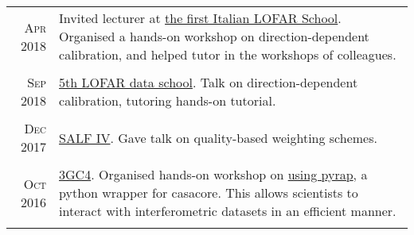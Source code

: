 \begin{tabular}{r|p{16.5cm}}
\textsc{Apr 2018} & Invited lecturer at \href{https://indico.ced.inaf.it/event/9/}{the first Italian LOFAR School}. Organised a hands-on workshop on direction-dependent calibration, and helped tutor in the workshops of colleagues.\\
\multicolumn{2}{c}{} \\

\textsc{Sep 2018} & \href{https://www.astron.nl/lofarschool2018/}{5th LOFAR data school}. Talk on direction-dependent calibration, tutoring hands-on tutorial.\\
\multicolumn{2}{c}{} \\

\textsc{Dec 2017} & \href{http://www.physics.usyd.edu.au/salf_iv/}{SALF IV}. Gave talk on quality-based weighting schemes.\\
\multicolumn{2}{c}{} \\

\textsc{Oct 2016} & \href{http://www.ast.uct.ac.za/ast/meetings-workshops/3gc4}{3GC4}. Organised hands-on workshop on \href{https://github.com/ebonnassieux/Teaching/blob/master/PyrapTutorial.ipynb}{using pyrap}, a python wrapper for casacore. This allows scientists to interact with interferometric datasets in an efficient manner.\\
\multicolumn{2}{c}{} \\
	
\end{tabular}


%
%
%		
%		

%
%
%


